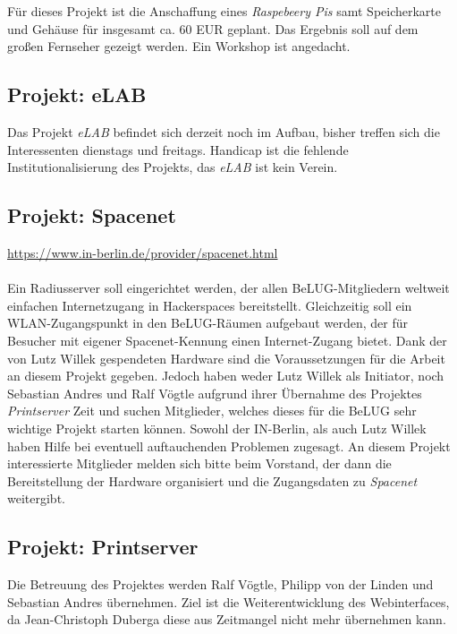 \documentclass[11pt,a4paper,ngerman]{article}
\newcommand{\urlwofont}[1]
{
\urlstyle{same}\url{#1}
}
\begin{document}
Für dieses Projekt ist die Anschaffung eines \emph{Raspebeery Pis} samt 
Speicherkarte und Gehäuse für insgesamt ca. 60 EUR geplant. Das Ergebnis soll 
auf dem großen Fernseher gezeigt werden. Ein Workshop ist angedacht.


  \subsection{Projekt: eLAB}
  
Das Projekt \emph{eLAB} befindet sich derzeit noch im Aufbau, bisher treffen 
sich die Interessenten dienstags und freitags. Handicap ist die fehlende 
Institutionalisierung des Projekts, das \emph{eLAB} ist kein Verein.


  \subsection{Projekt: Spacenet}

\urlwofont{https://www.in-berlin.de/provider/spacenet.html}\\
\\
Ein Radiusserver soll eingerichtet werden, der allen BeLUG-Mitgliedern 
weltweit einfachen Internetzugang in Hackerspaces bereitstellt. Gleichzeitig 
soll ein WLAN-Zugangspunkt in den BeLUG-Räumen aufgebaut werden, der für 
Besucher mit eigener Spacenet-Kennung einen Internet-Zugang bietet. Dank der 
von Lutz Willek gespendeten Hardware sind die Voraussetzungen für die Arbeit an 
diesem Projekt gegeben. Jedoch haben weder Lutz Willek als Initiator, noch 
Sebastian Andres und Ralf Vögtle aufgrund ihrer Übernahme des Projektes 
\emph{Printserver} Zeit und suchen Mitglieder, welches dieses für die BeLUG sehr 
wichtige Projekt starten können. Sowohl der IN-Berlin, als auch Lutz Willek 
haben Hilfe bei eventuell auftauchenden Problemen zugesagt. An diesem Projekt 
interessierte Mitglieder melden sich bitte beim Vorstand, der dann die 
Bereitstellung der Hardware organisiert und die Zugangsdaten zu \emph{Spacenet} 
weitergibt.



  \subsection{Projekt: Printserver}

Die Betreuung des Projektes werden Ralf Vögtle, Philipp von der Linden und 
Sebastian Andres übernehmen. Ziel ist die Weiterentwicklung des Webinterfaces, 
da Jean-Christoph Duberga diese aus Zeitmangel nicht mehr übernehmen kann.  
  
\end{document}
